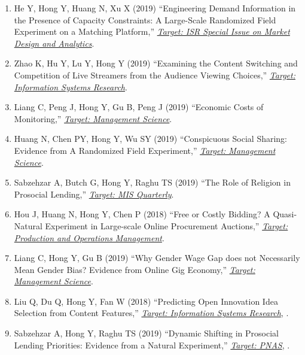 \documentclass[paper=letter,fontsize=10pt]{scrartcl} %
\newcommand{\ReviewEntry}[5]{
		\noindent #1 (#2) ``#3,'' \textit{\ul{#4}}, #5.}
\newcommand{\WPEntry}[5]{
        \noindent #1 (#2) ``#3,'' \textit{\ul{#4}}. #5}
\newcommand{\Hong}{Hong Y}
\begin{document}
\begin{enumerate}

\item \WPEntry{He Y, \Hong, Huang N, Xu X}{2019}{Engineering Demand Information in the Presence of Capacity Constraints: A Large-Scale Randomized Field Experiment on a Matching Platform}{\protect\newline Target: ISR Special Issue on Market Design and Analytics}{}{}

\item \WPEntry{Zhao K, Hu Y, Lu Y, \Hong}{2019}{Examining the Content Switching and Competition of Live Streamers from the Audience Viewing Choices}{\protect\newline Target: Information Systems Research}{}{}

\item \WPEntry{Liang C, Peng J, \Hong, Gu B, Peng J}{2019}{Economic Costs of Monitoring}{\protect\newline Target: Management Science}{}{}

\item \WPEntry{Huang N, Chen PY, \Hong, Wu SY}{2019}{Conspicuous Social Sharing: Evidence from A Randomized Field Experiment}{\protect\newline Target: Management Science}{}{}

\item \WPEntry{Sabzehzar A, Butch G, \Hong, Raghu TS}{2019}{The Role of Religion in Prosocial Lending}{\protect\newline Target: MIS Quarterly}{}{}

\item \WPEntry{Hou J, Huang N, \Hong, Chen P}{2018}{Free or Costly Bidding? A Quasi-Natural Experiment in Large-scale Online Procurement Auctions}{\protect\newline Target: Production and Operations Management}{}{}

\item \WPEntry{Liang C, \Hong, Gu B}{2019}{Why Gender Wage Gap does not Necessarily Mean Gender Bias? Evidence from Online Gig Economy}{\protect\newline Target: Management Science}{}{}

\item \ReviewEntry{Liu Q, Du Q, \Hong, Fan W}{2018}{Predicting Open Innovation Idea Selection from Content Features}{\protect\newline Target: Information Systems Research}{}{}

\item \ReviewEntry{Sabzehzar A, \Hong, Raghu TS}{2019}{Dynamic Shifting in Prosocial Lending Priorities: Evidence from a Natural Experiment}{\protect\newline Target: PNAS}{}{}


\end{enumerate}
\end{document}
